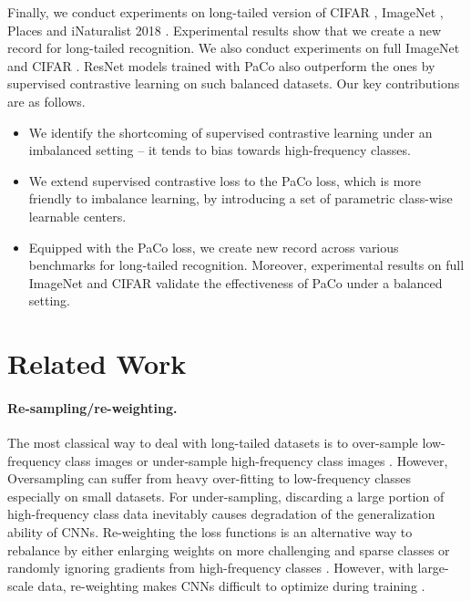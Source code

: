 \documentclass[10pt,twocolumn,letterpaper]{article}
\begin{document}
Finally, we conduct experiments on long-tailed version of CIFAR \cite{cb-focal, DBLP:conf/nips/CaoWGAM19}, ImageNet \cite{Liu_2019_CVPR}, Places \cite{Liu_2019_CVPR} and iNaturalist 2018 \cite{van2018inaturalist}. Experimental results show that we create a new record for long-tailed recognition. We also conduct experiments on full ImageNet \cite{imagenet} and CIFAR \cite{krizhevsky2009learning}. ResNet models trained with PaCo also outperform the ones by supervised contrastive learning on such balanced datasets. Our key contributions are as follows.
\begin{itemize}
	\item We identify the shortcoming of supervised contrastive learning under an imbalanced setting -- it tends to bias towards high-frequency classes.
	\vspace{-5pt}
	\item We extend supervised contrastive loss to the PaCo loss, which is more friendly to imbalance learning, by introducing a set of parametric class-wise learnable centers.
	\vspace{-15pt}
	\item Equipped with the PaCo loss, we create new record across various benchmarks for long-tailed recognition.
	Moreover, experimental results on full ImageNet and CIFAR validate the effectiveness of PaCo under a balanced setting.
\end{itemize}


\section{Related Work}
\paragraph{Re-sampling/re-weighting.}
The most classical way to deal with long-tailed datasets is to over-sample low-frequency class images \cite{shen2016relay, zhong2016towards, buda2018systematic, byrd2019effect}
or under-sample high-frequency class images \cite{he2009learning, japkowicz2002class,buda2018systematic}. However, Oversampling can suffer from heavy over-fitting to low-frequency
classes especially on small datasets. For under-sampling, discarding a large portion of high-frequency class data inevitably causes degradation of the generalization ability of CNNs. Re-weighting \cite{huang2016learning, huang2019deep,wang2017learning,ren2018learning,shu2019meta,jamal2020rethinking} the loss functions is an alternative way to rebalance by either enlarging weights on more challenging and sparse classes or randomly ignoring gradients from high-frequency classes \cite{tan2020eql}. However, with large-scale data, re-weighting makes CNNs difficult to optimize during training \cite{huang2016learning, huang2019deep}.
\end{document}
